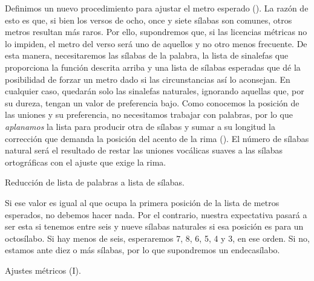 Definimos un nuevo procedimiento para ajustar el metro esperado (). La razón de esto es que, si bien los versos de ocho, once y siete sílabas son comunes, otros metros resultan más raros. Por ello, supondremos que, si las licencias métricas no lo impiden, el metro del verso será uno de aquellos y no otro menos frecuente. De esta manera, necesitaremos las sílabas de la palabra, la lista de sinalefas que proporciona la función descrita arriba y una lista de sílabas esperadas que dé la posibilidad de forzar un metro dado si las circunstancias así lo aconsejan. En cualquier caso, quedarán solo las sinalefas naturales, ignorando aquellas que, por su dureza, tengan un valor de preferencia bajo. Como conocemos la posición de las uniones y su preferencia, no necesitamos trabajar con palabras, por lo que \textit{aplanamos} la lista para producir otra de sílabas y sumar a su longitud la corrección que demanda la posición del acento de la rima (). El número de sílabas natural será el resultado de restar las uniones vocálicas suaves a las sílabas ortográficas con el ajuste que exige la rima.

\begin{algorithm}[!ht]
	\caption{Reducción de lista de palabras a lista de sílabas.}\label{list:VerseMetre17}
\end{algorithm}

Si ese valor es igual al que ocupa la primera posición de la lista de metros esperados, no debemos hacer nada. Por el contrario, nuestra expectativa pasará a ser esta si tenemos entre seis y nueve sílabas naturales si esa posición es para un octosílabo. Si hay menos de seis, esperaremos 7, 8, 6, 5, 4 y 3, en ese orden. Si no, estamos ante diez o más sílabas, por lo que supondremos un endecasílabo.

\begin{algorithm}[!ht]
	\caption{Ajustes métricos (I).}\label{list:VerSeMetre18}
\end{algorithm}

